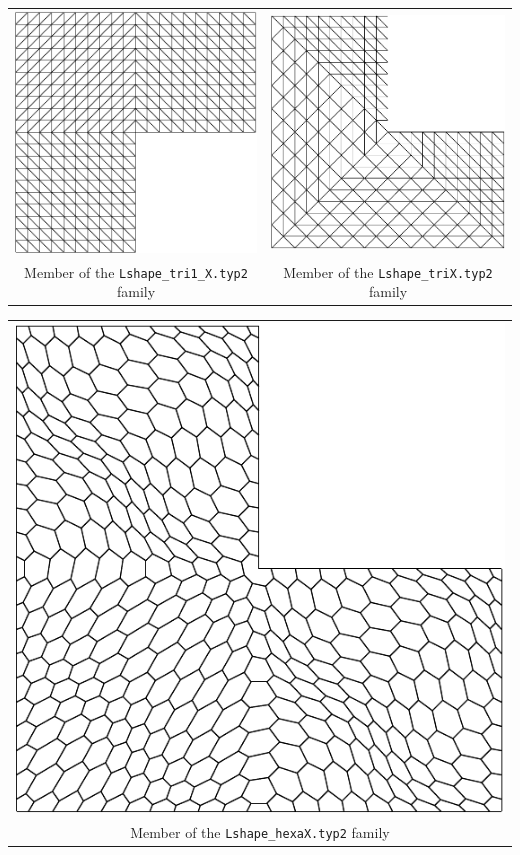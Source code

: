 \documentclass{article}
\begin{document}

\begin{center}
\begin{tabular}{cc}
\includegraphics[width=0.5\linewidth]{Lshape_tri1_2.pdf} & \includegraphics[width=0.5\linewidth]{Lshape_tri2.pdf}\\
{Member of the \texttt{Lshape\_tri1\_X.typ2} family} & {Member of the \texttt{Lshape\_triX.typ2} family}
\end{tabular}
\end{center}


\begin{center}
\begin{tabular}{c}
\includegraphics[width=0.5\linewidth]{Lshape_hexa2.pdf}\\
{Member of the \texttt{Lshape\_hexaX.typ2} family}
\end{tabular}
\end{center}
\end{document}
